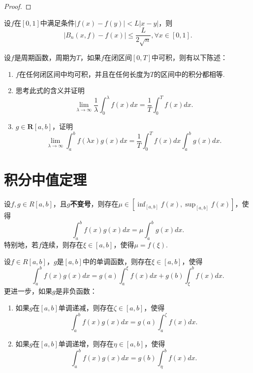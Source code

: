     \begin{proof}
        
    \end{proof}
    \begin{definition}[Bernstein多项式]
        
    \end{definition}
    \begin{example}
        设$f$在$\left[0,1\right]$中满足条件$\left|f(x)-f(y)\right|<L\left|x-y\right|$，则
        $$\left|B_n(x,f)-f(x)\right|\leq\frac{L}{2\sqrt{n}},\forall x\in\left[0,1\right].$$
    \end{example}
    \begin{example}[上一个例子的加强]
        
    \end{example}
    \begin{example}[Riemann引理]
        设$f$是周期函数，周期为$T$，如果$f$在闭区间$\left[0,T\right]$中可积，则有以下陈述：
        \begin{enumerate}
            \item $f$在任何闭区间中均可积，并且在任何长度为$T$的区间中的积分都相等.
            \item 思考此式的含义并证明$$\lim\limits_{\lambda\rightarrow\infty}\frac{1}{\lambda}\int_{0}^{\lambda}f(x)dx=\frac{1}{T}\int_{0}^{T}f(x)dx.$$
            \item $g\in\bm{R}\left[a,b\right]$，证明$$\lim\limits_{\lambda\rightarrow\infty}\int_{a}^{b}f(\lambda x)g(x)dx=\frac{1}{T}\int_{0}^{T}f(x)dx\int_{a}^{b}g(x)dx.$$
        \end{enumerate}
    \end{example}
    \section{积分中值定理}
    \begin{theorem}[积分第一中值定理]
        设$f,g\in R\left[a,b\right]$，且$g$\textbf{不变号}，则存在$\mu\in\left[\inf_{\left[a,b\right]}f(x),\sup_{\left[a,b\right]}f(x)\right]$，使得$$\int_{a}^{b}f(x)g(x)dx = \mu\int_{a}^{b}g(x)dx.$$
        特别地，若$f$连续，则存在$\xi\in\left[a,b\right]$，使得$\mu=f(\xi)$.
    \end{theorem}
    \begin{theorem}[积分第二中值定理]
        设$f\in R\left[a,b\right]$，$g$是$\left[a,b\right]$中的单调函数，则存在$\xi\in\left[a,b\right]$，使得$$\int_{a}^{b}f(x)g(x)dx = g(a)\int_{a}^{\xi}f(x)dx + g(b)\int_{\xi}^{b}f(x)dx.$$
        更进一步，如果$g$是非负函数：
        \begin{enumerate}
            \item 如果$g$在$\left[a,b\right]$单调递减，则存在$\zeta\in\left[a,b\right]$，使得$$\int_a^bf(x)g(x)dx=g(a)\int_{a}^{\zeta}f(x)dx.$$
            \item 如果$g$在$\left[a,b\right]$单调递增，则存在$\eta\in\left[a,b\right]$，使得$$\int_a^bf(x)g(x)dx=g(b)\int_{\eta}^{b}f(x)dx.$$
        \end{enumerate}
    \end{theorem}
